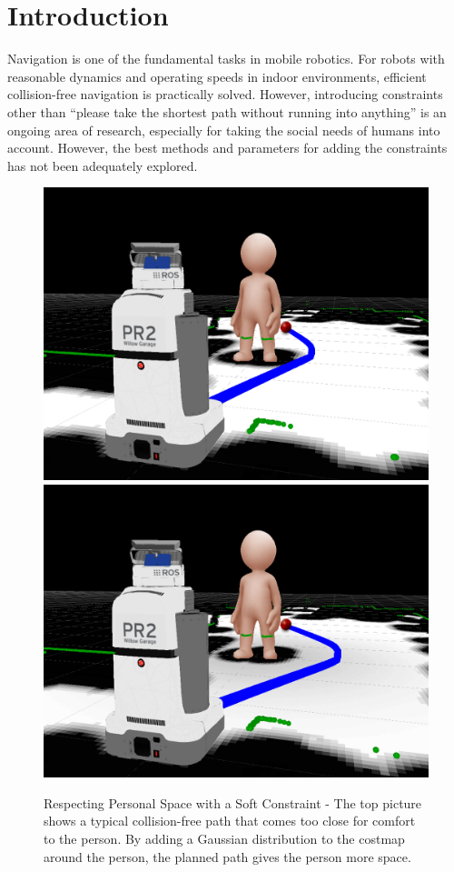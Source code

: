 \section{Introduction}
Navigation is one of the fundamental tasks in mobile robotics. For robots with reasonable dynamics and operating speeds in indoor environments, efficient collision-free navigation is practically solved. However, introducing constraints other than ``please take the shortest path without running into anything'' is an ongoing area of research, especially for taking the social needs of humans into account. However, the best methods and parameters for adding the constraints has not been adequately explored. 

\begin{figure}
\includegraphics[width=\columnwidth]{graphix/pr2base.png}\\
\includegraphics[width=\columnwidth]{graphix/pr2social.png}
\caption{Respecting Personal Space with a Soft Constraint - The top picture shows a typical collision-free path that comes too close for comfort to the person. By adding a Gaussian distribution to the costmap around the person, the planned path gives the person more space.}
\label{fig:intro}
\end{figure}

